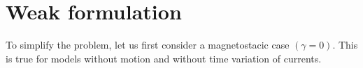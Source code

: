 \newpage
\chapter{Weak formulation}

\noindent To simplify the problem, let us first consider a magnetostacic case $(\gamma = 0)$. This is true for models without motion and without time variation of currents.






